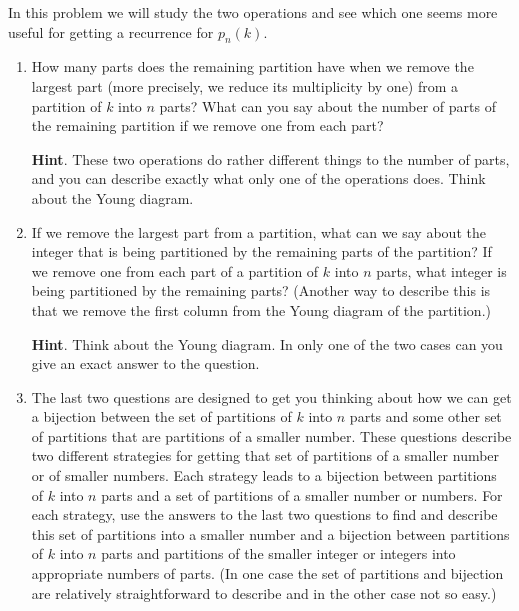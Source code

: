 \documentclass{book}
\begin{document}
\setcounter{cpjt}{215}
\addtocounter{cpjt}{-1}
\begin{activity}\label{numberpartitionrecurrence}
\hypertarget{p-1142}{}%
In this problem we will study the two operations and see which one seems more useful for getting a recurrence for \(p_n(k)\).%
\begin{enumerate}[font=\bfseries,label=(\alph*),ref=\alph*]
\item\label{task-217} \hypertarget{p-1143}{}%
How many parts does the remaining partition have when we remove the largest part (more precisely, we reduce its multiplicity by one) from a partition of \(k\) into \(n\) parts?  What can you say about the number of parts of the remaining partition if we remove one from each part?%
\par\smallskip%
\noindent\textbf{Hint}.\hypertarget{hint-134}{}\quad%
\hypertarget{p-1144}{}%
These two operations do rather different things to the number of parts, and you can describe exactly what only one of the operations does. Think about the Young diagram.%
\par\smallskip%
\noindent\item\label{task-218} \hypertarget{p-1146}{}%
If we remove the largest part from a partition, what can we say about the integer that is being partitioned by the remaining parts of the partition? If we remove one from each part of a partition of \(k\) into \(n\) parts, what integer is being partitioned by the remaining parts? (Another way to describe this is that we remove the first column from the Young diagram of the partition.)%
\par\smallskip%
\noindent\textbf{Hint}.\hypertarget{hint-135}{}\quad%
\hypertarget{p-1147}{}%
Think about the Young diagram. In only one of the two cases can you give an exact answer to the question.%
\par\smallskip%
\noindent\item\label{task-219} \hypertarget{p-1149}{}%
The last two questions are designed to get you thinking about how we can get a bijection between the set of partitions of \(k\) into \(n\) parts and some other set of partitions that are partitions of a smaller number.  These questions describe two different strategies for getting that set of partitions of a smaller number or of smaller numbers.  Each strategy leads to a bijection between partitions of \(k\) into \(n\) parts and a set of partitions of a smaller number or numbers.  For each strategy, use the answers to the last two questions to find and describe this set of partitions into a smaller number and a bijection between partitions of \(k\) into \(n\) parts and partitions of the smaller integer or integers into appropriate numbers of parts. (In one case the set of partitions and bijection are relatively straightforward to describe and in the other case not so easy.)%

\end{enumerate}
\end{activity}
\end{document}
